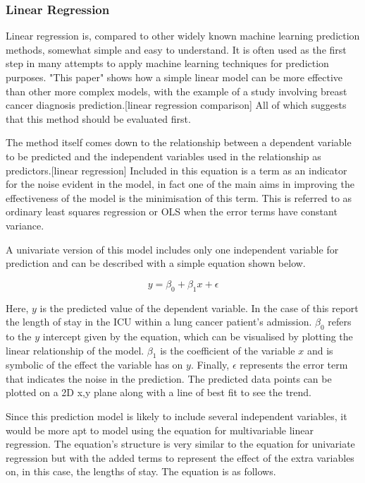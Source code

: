 \documentclass[11pt]{article}
\begin{document}
\subsubsection{Linear Regression}
Linear regression is, compared to other widely known machine learning prediction methods, somewhat simple and easy to understand. It is often used as the first step in many attempts to apply machine learning techniques for prediction purposes. "This paper" shows how a simple linear model can be more effective than other more complex models, with the example of a study involving breast cancer diagnosis prediction.[linear regression comparison] All of which suggests that this method should be evaluated first.

The method itself comes down to the relationship between a dependent variable to be predicted and the independent variables used in the relationship as predictors.[linear regression] Included in this equation is a term as an indicator for the noise evident in the model, in fact one of the main aims in improving the effectiveness of the model is the minimisation of this term. This is referred to as ordinary least squares regression or OLS when the error terms have constant variance.

A univariate version of this model includes only one independent variable for prediction and can be described with a simple equation shown below.

\[y = \beta_0 + \beta_1x +\epsilon\]

Here, \(y\) is the predicted value of the dependent variable. In the case of this report the length of stay in the ICU within a lung cancer patient's admission. \(\beta_0\) refers to the \(y\) intercept given by the equation, which can be visualised by plotting the linear relationship of the model. \(\beta_1\) is the coefficient of the variable \(x\) and is symbolic of the effect the variable has on \(y\). Finally, \(\epsilon\) represents the error term that indicates the noise in the prediction. The predicted data points can be plotted on a 2D x,y plane along with a line of best fit to see the trend.

Since this prediction model is likely to include several independent variables, it would be more apt to model using the equation for multivariable linear regression. The equation's structure is very similar to the equation for univariate regression but with the added terms to represent the effect of the extra variables on, in this case, the lengths of stay. The equation is as follows.
\end{document}
